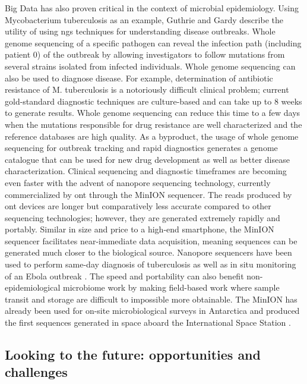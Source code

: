 Big Data has also proven critical in the context of microbial epidemiology. Using Mycobacterium tuberculosis as an example, Guthrie and Gardy \cite{Guthrie2017} describe the utility of using \gls{ngs} techniques for understanding disease outbreaks. Whole genome sequencing of a specific pathogen can reveal the infection path (including patient 0) of the outbreak by allowing investigators to follow mutations from several strains isolated from infected individuals. Whole genome sequencing can also be used to diagnose disease. For example, determination of antibiotic resistance of M. tuberculosis is a notoriously difficult clinical problem; current gold-standard diagnostic techniques are culture-based and can take up to 8 weeks to generate results. Whole genome sequencing can reduce this time to a few days when the mutations responsible for drug resistance are well characterized and the reference databases are high quality. As a byproduct, the usage of whole genome sequencing for outbreak tracking and rapid diagnostics generates a genome catalogue that can be used for new drug development as well as better disease characterization. Clinical sequencing and diagnostic timeframes are becoming even faster with the advent of nanopore sequencing technology, currently commercialized by \gls{ont} through the MinION sequencer. The reads produced by \gls{ont} devices are longer but comparatively less accurate compared to other sequencing technologies; however, they are generated extremely rapidly and portably. Similar in size and price to a high-end smartphone, the MinION sequencer facilitates near-immediate data acquisition, meaning sequences can be generated much closer to the biological source. Nanopore sequencers have been used to perform same-day diagnosis of tuberculosis \cite{Votintseva2017} as well as in situ monitoring of an Ebola outbreak \cite{Quick2016}. The speed and portability can also benefit non-epidemiological microbiome work by making field-based work where sample transit and storage are difficult to impossible more obtainable. The MinION has already been used for on-site microbiological surveys in Antarctica \cite{Johnson2017} and produced the first sequences generated in space aboard the International Space Station \cite{Castro-Wallace2016}.

\subsection{Looking to the future: opportunities and challenges}

